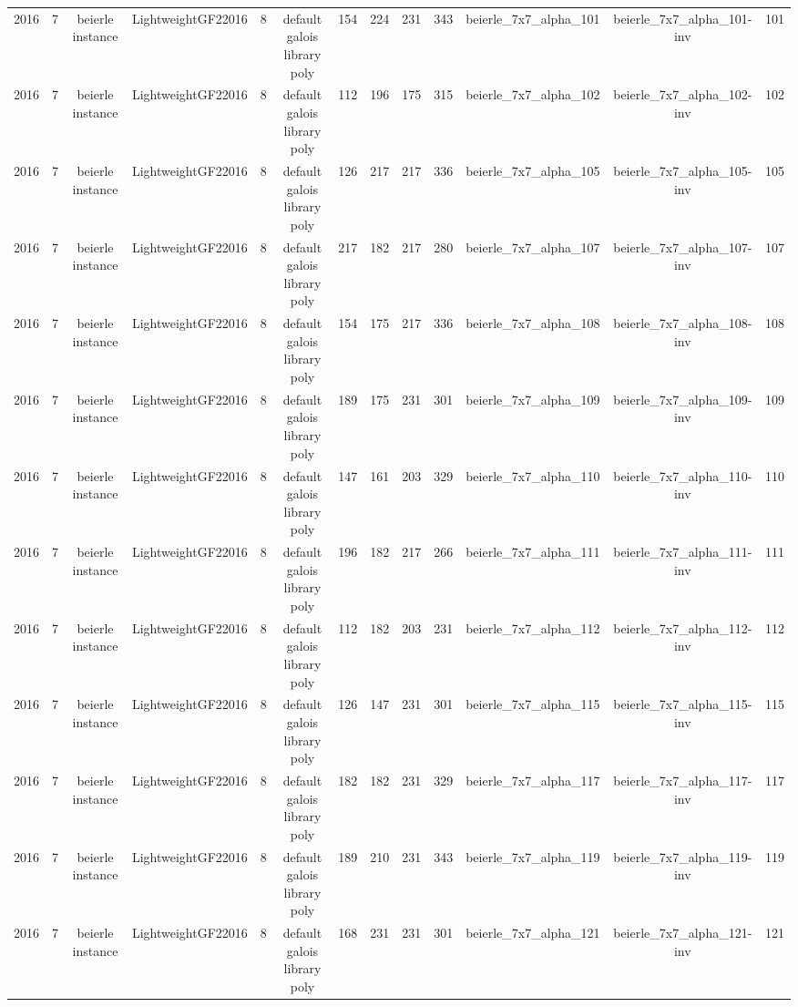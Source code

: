 \begin{tabular}{c c c c c c c c c c c c c}
2016 & 7 & beierle instance & LightweightGF22016 & 8 & default galois library poly & 154 & 224 & 231 & 343 & beierle_7x7_alpha_101 & beierle_7x7_alpha_101-inv & 101 \\
2016 & 7 & beierle instance & LightweightGF22016 & 8 & default galois library poly & 112 & 196 & 175 & 315 & beierle_7x7_alpha_102 & beierle_7x7_alpha_102-inv & 102 \\
2016 & 7 & beierle instance & LightweightGF22016 & 8 & default galois library poly & 126 & 217 & 217 & 336 & beierle_7x7_alpha_105 & beierle_7x7_alpha_105-inv & 105 \\
2016 & 7 & beierle instance & LightweightGF22016 & 8 & default galois library poly & 217 & 182 & 217 & 280 & beierle_7x7_alpha_107 & beierle_7x7_alpha_107-inv & 107 \\
2016 & 7 & beierle instance & LightweightGF22016 & 8 & default galois library poly & 154 & 175 & 217 & 336 & beierle_7x7_alpha_108 & beierle_7x7_alpha_108-inv & 108 \\
2016 & 7 & beierle instance & LightweightGF22016 & 8 & default galois library poly & 189 & 175 & 231 & 301 & beierle_7x7_alpha_109 & beierle_7x7_alpha_109-inv & 109 \\
2016 & 7 & beierle instance & LightweightGF22016 & 8 & default galois library poly & 147 & 161 & 203 & 329 & beierle_7x7_alpha_110 & beierle_7x7_alpha_110-inv & 110 \\
2016 & 7 & beierle instance & LightweightGF22016 & 8 & default galois library poly & 196 & 182 & 217 & 266 & beierle_7x7_alpha_111 & beierle_7x7_alpha_111-inv & 111 \\
2016 & 7 & beierle instance & LightweightGF22016 & 8 & default galois library poly & 112 & 182 & 203 & 231 & beierle_7x7_alpha_112 & beierle_7x7_alpha_112-inv & 112 \\
2016 & 7 & beierle instance & LightweightGF22016 & 8 & default galois library poly & 126 & 147 & 231 & 301 & beierle_7x7_alpha_115 & beierle_7x7_alpha_115-inv & 115 \\
2016 & 7 & beierle instance & LightweightGF22016 & 8 & default galois library poly & 182 & 182 & 231 & 329 & beierle_7x7_alpha_117 & beierle_7x7_alpha_117-inv & 117 \\
2016 & 7 & beierle instance & LightweightGF22016 & 8 & default galois library poly & 189 & 210 & 231 & 343 & beierle_7x7_alpha_119 & beierle_7x7_alpha_119-inv & 119 \\
2016 & 7 & beierle instance & LightweightGF22016 & 8 & default galois library poly & 168 & 231 & 231 & 301 & beierle_7x7_alpha_121 & beierle_7x7_alpha_121-inv & 121 \\

\end{tabular}
